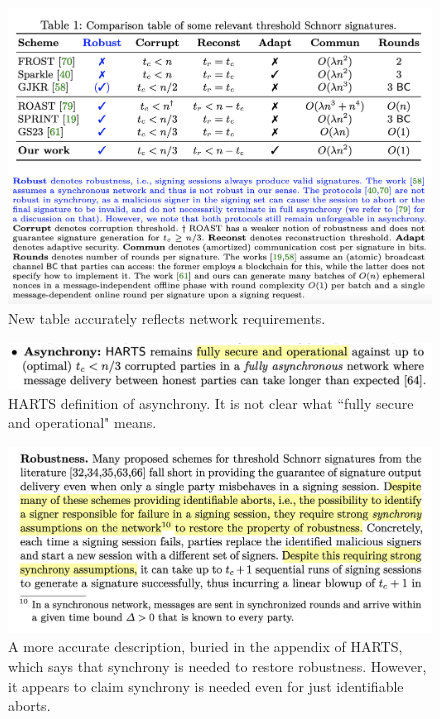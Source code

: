 \begin{figure}
    \centering
    \includegraphics[scale=0.45]{images/HARTS_table_new.png}
    \caption{New table accurately reflects network requirements.}
\end{figure}

\begin{figure}
    \centering
    \includegraphics[width=1\linewidth]{images/HARTS_async_defn.png}
    \caption{HARTS definition of asynchrony. It is not clear what ``fully secure and operational" means.}
\end{figure}

\begin{figure}
    \centering
    \includegraphics[width=1\linewidth]{images/HARTS_appendix.png}
    \caption{A more accurate description, buried in the appendix of HARTS, which says that synchrony is needed to restore robustness.  However, it appears to claim synchrony is needed even for just identifiable aborts.}
\end{figure}

